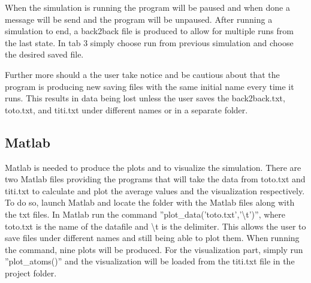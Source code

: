 When the simulation is running the program will be paused and when done a message will be send and the program will be unpaused. After running a simulation to end, a back2back file is produced to allow for multiple runs from the last state. In tab 3 simply choose run from previous simulation and choose the desired saved file.

Further more should a the user take notice and be cautious about that the program is producing new saving files with the same initial name every time it runs. This results in data being lost unless the user saves the back2back.txt, toto.txt, and titi.txt under different names or in a separate folder.

\subsection{Matlab}
Matlab is needed to produce the plots and to visualize the simulation. There are two Matlab files providing the programs that will take the data from toto.txt and titi.txt to calculate and plot the average values and the visualization respectively. To do so, launch Matlab and locate the folder with the Matlab files along with the txt files. In Matlab run the command ''plot\_data('toto.txt','\textbackslash{}t')'', where toto.txt is the name of the datafile and \textbackslash{}t is the delimiter. This allows the user to save files under different names and still being able to plot them. When running the command, nine plots will be produced. For the visualization part, simply run ''plot\_atoms()'' and the visualization will be loaded from the titi.txt file in the project folder.